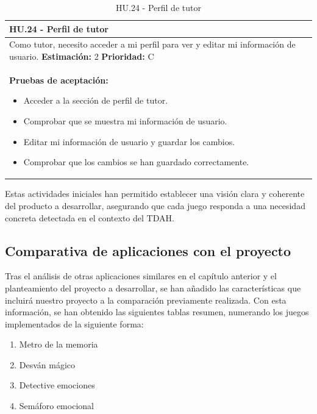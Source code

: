 \begin{table}[H]
\centering
\begin{tabularx}{\textwidth}{|X|}
\hline
\textbf{HU.24 - Perfil de tutor}  \\
\hline
Como tutor, necesito acceder a mi perfil para ver y editar mi información de usuario.
\clearpage
\textbf{Estimación: }2
\clearpage
\textbf{Prioridad: }C
\\
\hline
\textbf{Pruebas de aceptación:}
\begin{itemize}
    \item Acceder a la sección de perfil de tutor.
    \item Comprobar que se muestra mi información de usuario.
    \item Editar mi información de usuario y guardar los cambios.
    \item Comprobar que los cambios se han guardado correctamente.
\end{itemize}
\\
\hline
\end{tabularx}
\caption{HU.24 - Perfil de tutor}
\end{table}

Estas actividades iniciales han permitido establecer una visión clara y coherente del producto a desarrollar, asegurando que cada juego responda a una necesidad concreta detectada en el contexto del TDAH.

\newpage
\subsection{Comparativa de aplicaciones con el proyecto}
Tras el análisis de otras aplicaciones similares en el capítulo anterior y el planteamiento del proyecto a desarrollar, se han añadido las características que incluirá nuestro proyecto a la comparación previamente realizada. Con esta información, se han obtenido las siguientes tablas resumen, numerando los juegos implementados de la siguiente forma:

\begin{enumerate}
    \item Metro de la memoria
    \item Desván mágico
    \item Detective emociones
    \item Semáforo emocional
\end{enumerate}

